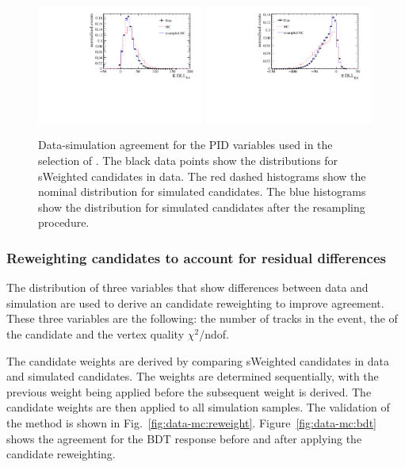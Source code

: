 \begin{figure}[!tb]
 \centering
 \includegraphics[width=0.49\textwidth]{figs/kpimm/data-mc/resampling/K_PIDK.pdf}
 \includegraphics[width=0.49\textwidth]{figs/kpimm/data-mc/resampling/Pi_PIDK.pdf}
 \caption{Data-simulation agreement for the PID variables used in the selection of \BdToKpimm. The black data points show the distributions for sWeighted \BdToJPsiKst candidates in data. The red dashed histograms show the nominal distribution for simulated \BdToJPsiKst candidates. The blue histograms show the distribution for simulated \BdToJPsiKst candidates after the resampling procedure.}
\label{fig:kpimm:data-mc:pid}
\end{figure}

\subsubsection{Reweighting candidates to account for residual differences}
\label{sec:kpimm:data-mc:reweight}

The distribution of three variables that show differences between data and simulation are used to derive an candidate reweighting to improve agreement. These three variables are the following: the number of tracks in the event, the \pt of the \Bz candidate and the \Bz vertex quality $\chi^{2}$/ndof.
 
The candidate weights are derived by comparing sWeighted \BdToJPsiKst candidates in data and simulated \BdToJPsiKst candidates. 
The weights are determined sequentially, with the previous weight being applied before the subsequent weight is derived. The candidate weights are then applied to all simulation samples. The validation of the method is shown in Fig.~\ref{fig:data-mc:reweight}. Figure~\ref{fig:data-mc:bdt} shows the agreement for the BDT response before and after applying the candidate reweighting.

